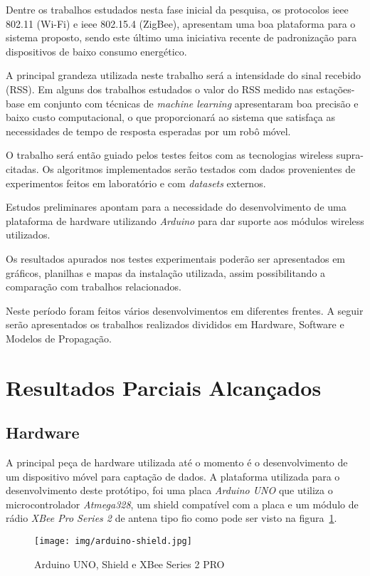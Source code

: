 Dentre os trabalhos estudados nesta fase inicial da pesquisa, os protocolos ieee 802.11 (Wi-Fi) e ieee 802.15.4 (ZigBee), apresentam uma boa plataforma para o sistema proposto, sendo este último uma iniciativa recente de padronização para dispositivos de baixo consumo energético.

A principal grandeza utilizada neste trabalho será a intensidade do sinal recebido (RSS). Em alguns dos trabalhos estudados o valor do RSS medido nas estações-base em conjunto com técnicas de \textit{machine learning} apresentaram boa precisão e baixo custo computacional, o que proporcionará ao sistema que satisfaça as necessidades de tempo de resposta esperadas por um robô móvel. 

O trabalho será então guiado pelos testes feitos com as tecnologias wireless supra-citadas. Os algoritmos implementados serão testados com dados provenientes de experimentos feitos em laboratório e com \textit{datasets} externos.

Estudos preliminares apontam para a necessidade do desenvolvimento de uma plataforma de hardware utilizando \textit{Arduino} para dar suporte aos módulos wireless utilizados.

Os resultados apurados nos testes experimentais poderão ser apresentados em gráficos, planilhas e mapas da instalação utilizada, assim possibilitando a comparação com trabalhos relacionados.

Neste período foram feitos vários desenvolvimentos em diferentes frentes. A seguir serão apresentados os trabalhos realizados divididos em Hardware, Software e Modelos de Propagação.

\section{Resultados Parciais Alcançados}
\subsection*{Hardware}

A principal peça de hardware utilizada até o momento é o desenvolvimento de um dispositivo móvel para captação de dados. A plataforma utilizada para o desenvolvimento deste protótipo, foi uma placa \textit{Arduino UNO} que utiliza o microcontrolador \textit{Atmega328}, um shield compatível com a placa e um módulo de rádio \textit{XBee Pro Series 2} de antena tipo fio como pode ser visto na figura~\ref{fig:arduino-shield}.

\begin{figure}[ht]
\centering
\texttt{[image: img/arduino-shield.jpg]}
\caption{Arduino UNO, Shield e XBee Series 2 PRO\label{fig:arduino-shield}}
\end{figure}

